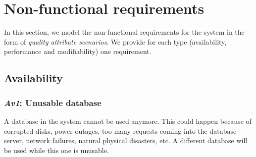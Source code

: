 \chapter{Non-functional requirements}\label{sec:non-functional}
In this section, we model the non-functional requirements for the system in the
form of \emph{quality attribute scenarios}. We provide for each type
(availability, performance and modifiability) one requirement.

\section{Availability}
\subsection{\emph{Av1}: Unusable database}
A database in the system cannot be used anymore. This could happen because of
corrupted disks, power outages, too many requests coming into the database
server, network failures, natural physical disasters, etc. A different database
will be used while this one is unusable.

